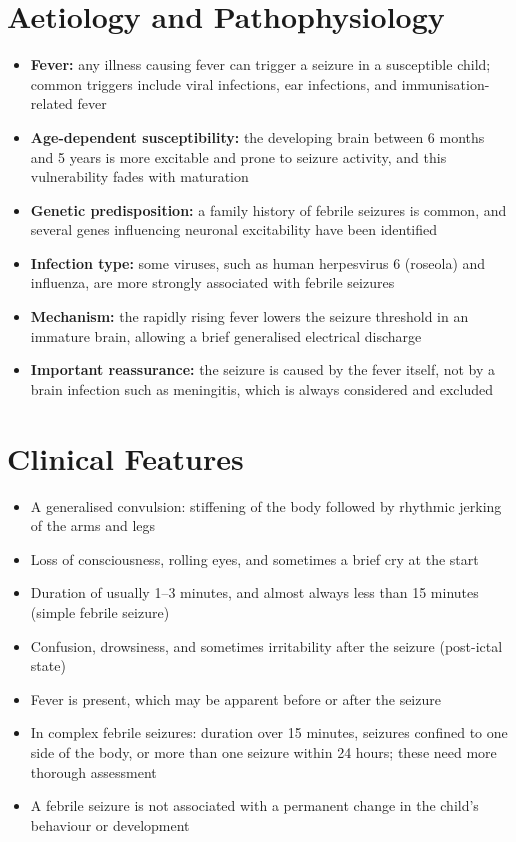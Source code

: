 \section*{Aetiology and Pathophysiology}
\begin{itemize}
    \item \textbf{Fever:} any illness causing fever can trigger a seizure in a susceptible child; common triggers include viral infections, ear infections, and immunisation-related fever
    \item \textbf{Age-dependent susceptibility:} the developing brain between 6 months and 5 years is more excitable and prone to seizure activity, and this vulnerability fades with maturation
    \item \textbf{Genetic predisposition:} a family history of febrile seizures is common, and several genes influencing neuronal excitability have been identified
    \item \textbf{Infection type:} some viruses, such as human herpesvirus 6 (roseola) and influenza, are more strongly associated with febrile seizures
    \item \textbf{Mechanism:} the rapidly rising fever lowers the seizure threshold in an immature brain, allowing a brief generalised electrical discharge
    \item \textbf{Important reassurance:} the seizure is caused by the fever itself, not by a brain infection such as meningitis, which is always considered and excluded
\end{itemize}

\section*{Clinical Features}
\begin{itemize}
    \item A generalised convulsion: stiffening of the body followed by rhythmic jerking of the arms and legs
    \item Loss of consciousness, rolling eyes, and sometimes a brief cry at the start
    \item Duration of usually 1--3 minutes, and almost always less than 15 minutes (simple febrile seizure)
    \item Confusion, drowsiness, and sometimes irritability after the seizure (post-ictal state)
    \item Fever is present, which may be apparent before or after the seizure
    \item In complex febrile seizures: duration over 15 minutes, seizures confined to one side of the body, or more than one seizure within 24 hours; these need more thorough assessment
    \item A febrile seizure is not associated with a permanent change in the child's behaviour or development
\end{itemize}

